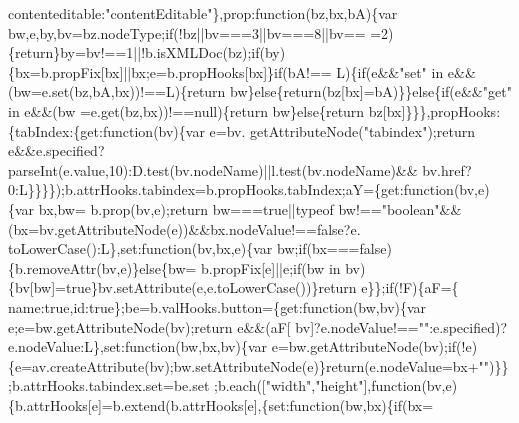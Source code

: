 \begin{DoxyCode}
      contenteditable:\textcolor{stringliteral}{"contentEditable"}\},prop:\textcolor{keyword}{function}(bz,bx,bA)\{var bw,e,by,bv=bz.nodeType;\textcolor{keywordflow}{if}(!bz||bv===3||bv===8||bv==
      =2)\{\textcolor{keywordflow}{return}\}by=bv!==1||!b.isXMLDoc(bz);\textcolor{keywordflow}{if}(by)\{bx=b.propFix[bx]||bx;e=b.propHooks[bx]\}\textcolor{keywordflow}{if}(bA!==
      L)\{\textcolor{keywordflow}{if}(e&&\textcolor{stringliteral}{"set"} in e&&(bw=e.set(bz,bA,bx))!==L)\{\textcolor{keywordflow}{return} bw\}\textcolor{keywordflow}{else}\{\textcolor{keywordflow}{return}(bz[bx]=bA)\}\}\textcolor{keywordflow}{else}\{\textcolor{keywordflow}{if}(e&&\textcolor{stringliteral}{"get"} in e&&(bw
      =e.get(bz,bx))!==null)\{\textcolor{keywordflow}{return} bw\}\textcolor{keywordflow}{else}\{\textcolor{keywordflow}{return} bz[bx]\}\}\},propHooks:\{tabIndex:\{\textcolor{keyword}{get}:\textcolor{keyword}{function}(bv)\{var e=bv.
      getAttributeNode(\textcolor{stringliteral}{"tabindex"});\textcolor{keywordflow}{return} e&&e.specified?parseInt(e.value,10):D.test(bv.nodeName)||l.test(bv.nodeName)&&
      bv.href?0:L\}\}\}\});b.attrHooks.tabindex=b.propHooks.tabIndex;aY=\{\textcolor{keyword}{get}:\textcolor{keyword}{function}(bv,e)\{var bx,bw=
      b.prop(bv,e);\textcolor{keywordflow}{return} bw===\textcolor{keyword}{true}||typeof bw!==\textcolor{stringliteral}{"boolean"}&&(bx=bv.getAttributeNode(e))&&bx.nodeValue!==\textcolor{keyword}{false}?e.
      toLowerCase():L\},\textcolor{keyword}{set}:\textcolor{keyword}{function}(bv,bx,e)\{var bw;\textcolor{keywordflow}{if}(bx===\textcolor{keyword}{false})\{b.removeAttr(bv,e)\}\textcolor{keywordflow}{else}\{bw=
      b.propFix[e]||e;\textcolor{keywordflow}{if}(bw in bv)\{bv[bw]=\textcolor{keyword}{true}\}bv.setAttribute(e,e.toLowerCase())\}\textcolor{keywordflow}{return} e\}\};\textcolor{keywordflow}{if}(!F)\{aF=\{
      name:\textcolor{keyword}{true},\textcolor{keywordtype}{id}:\textcolor{keyword}{true}\};be=b.valHooks.button=\{\textcolor{keyword}{get}:\textcolor{keyword}{function}(bw,bv)\{var e;e=bw.getAttributeNode(bv);\textcolor{keywordflow}{return} e&&(aF[
      bv]?e.nodeValue!==\textcolor{stringliteral}{""}:e.specified)?e.nodeValue:L\},\textcolor{keyword}{set}:\textcolor{keyword}{function}(bw,bx,bv)\{var e=bw.getAttributeNode(bv);\textcolor{keywordflow}{if}(!e)
      \{e=av.createAttribute(bv);bw.setAttributeNode(e)\}\textcolor{keywordflow}{return}(e.nodeValue=bx+\textcolor{stringliteral}{""})\}\};b.attrHooks.tabindex.set=be.set
      ;b.each([\textcolor{stringliteral}{"width"},\textcolor{stringliteral}{"height"}],\textcolor{keyword}{function}(bv,e)\{b.attrHooks[e]=b.extend(b.attrHooks[e],\{set:function(bw,bx)\{if(bx=

\end{DoxyCode}
